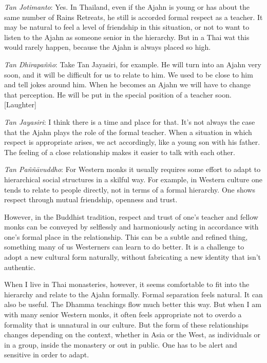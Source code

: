 \emph{Tan Jotimanto}: Yes. In Thailand, even if the Ajahn is young or
has about the same number of Rains Retreats, he still is accorded formal
respect as a teacher. It may be natural to feel a level of friendship in
this situation, or not to want to listen to the Ajahn as someone senior
in the hierarchy. But in a Thai wat this would rarely happen, because
the Ajahn is always placed so high. 

\emph{Tan Dhīrapañño}: Take Tan Jayasiri, for example. He will turn
into an Ajahn very soon, and it will be difficult for us to relate to
him. We used to be close to him and tell jokes around him. When he
becomes an Ajahn we will have to change that perception. He will be put
in the special position of a teacher soon. [Laughter]

\emph{Tan Jayasiri}: I think there is a time and place for that. It's
not always the case that the Ajahn plays the role of the formal teacher. 
When a situation in which respect is appropriate arises, we act
accordingly, like a young son with his father. The feeling of a close
relationship makes it easier to talk with each other. 

\emph{Tan Paññāvuddho}: For Western monks it usually requires some
effort to adapt to hierarchical social structures in a skilful way. For
example, in Western culture one tends to relate to people directly, not
in terms of a formal hierarchy. One shows respect through mutual
friendship, openness and trust.

However, in the Buddhist tradition, 
respect and trust of one's teacher and fellow monks can be conveyed by
selflessly and harmoniously acting in accordance with one's formal place
in the relationship. This can be a subtle and refined thing, something
many of us Westerners can learn to do better. It is a challenge to adopt
a new cultural form naturally, without fabricating a new identity that
isn't authentic.

When I live in Thai monasteries, however, it seems
comfortable to fit into the hierarchy and relate to the Ajahn formally. 
Formal separation feels natural. It can also be useful. The Dhamma
teachings flow much better this way. But when I am with many senior
Western monks, it often feels appropriate not to overdo a formality that
is unnatural in our culture. But the form of these relationships changes
depending on the context, whether in Asia or the West, as individuals or
in a group, inside the monastery or out in public. One has to be alert
and sensitive in order to adapt. 

